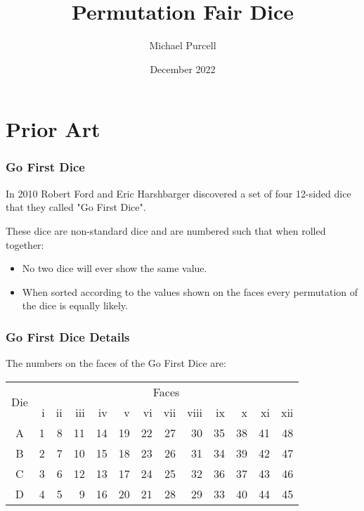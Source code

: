 \documentclass[aspectratio=169]{beamer}
\title{Permutation Fair Dice}
\author{Michael Purcell}
\date{December 2022}
\begin{document}
\small
\begin{frame}[Triangle=siiorange]
\titlepage
\end{frame}

\section{Prior Art}
\begin{frame}[Triangle=siiorange]
	\tocpage
\end{frame}

\begin{frame}[triangle=siiblue]
\frametitle{Go First Dice}
In 2010 Robert Ford and Eric Harshbarger discovered a set of four 12-sided dice that they called "Go First Dice".

\vfill

These dice are non-standard dice and are numbered such that when rolled together:
\begin{itemize}
	\item No two dice will ever show the same value.
	\item When sorted according to the values shown on the faces every permutation of the dice is equally likely.
\end{itemize}
\end{frame}

\begin{frame}[triangle=siiblue]
\frametitle{Go First Dice Details}
The numbers on the faces of the Go First Dice are:
{
\footnotesize
\begin{table}
\begin{tabular}{c rrrrrrrrrrrr} \toprule
\multirow{2}[2]{*}{Die} &  \multicolumn{12}{c}{Faces} \\ \cmidrule(lr){2-13}     
   & i & ii & iii & iv & v & vi & vii & viii & ix & x & xi & xii \\ \midrule
A & 1 & 8 & 11 & 14 & 19 & 22 & 27 & 30 & 35 & 38 & 41 & 48 \\
B & 2 & 7 & 10 & 15 & 18 & 23 & 26 & 31 & 34 & 39 & 42 & 47 \\
C & 3 & 6 & 12 & 13 & 17 & 24 & 25 & 32 & 36 & 37 & 43 & 46 \\
D & 4 & 5 & 9 & 16 & 20 & 21 & 28 & 29 & 33 & 40 & 44 & 45 \\ \bottomrule
\end{tabular}
\end{table}
}
\end{frame}
\end{document}
